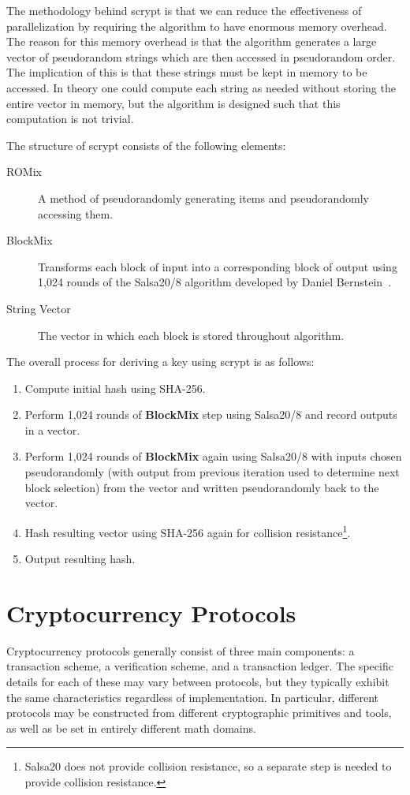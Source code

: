 \documentclass[11pt]{article}
\begin{document}
The methodology behind scrypt is that we can
reduce the effectiveness of parallelization by requiring the algorithm to have
enormous memory overhead. The reason for this memory overhead is that the
algorithm generates a large vector of pseudorandom strings which are then
accessed in pseudorandom order. The implication of this is that these strings
must be kept in memory to be accessed. In theory one could compute each string
as needed without storing the entire vector in memory, but the algorithm is
designed such that this computation is not trivial.

The structure of scrypt consists of the following elements:
\begin{description}
\item[ROMix] A method of pseudorandomly generating items and pseudorandomly
    accessing them.
\item[BlockMix] Transforms each block of input into a corresponding block of
    output using 1,024 rounds of the {\sc Salsa20/8} algorithm developed by Daniel
    Bernstein~\cite{bernstein08}.
\item[String Vector] The vector in which each block is stored throughout
    algorithm.
\end{description}

The overall process for deriving a key using scrypt is as follows:
\begin{enumerate}
    \item Compute initial hash using {\sc SHA-256}.
    \item Perform 1,024 rounds of \textbf{BlockMix} step using {\sc Salsa20/8}
        and record outputs in a vector.
    \item Perform 1,024 rounds of \textbf{BlockMix} again using {\sc Salsa20/8}
        with inputs chosen pseudorandomly (with output from previous iteration
        used to determine next block selection) from the vector and written
        pseudorandomly back to the vector.
    \item Hash resulting vector using {\sc SHA-256} again for collision
        resistance\footnote{{\sc Salsa20} does not provide collision resistance,
        so a separate step is needed to provide collision resistance.}.
    \item Output resulting hash.
\end{enumerate}

\section{Cryptocurrency Protocols}
Cryptocurrency protocols generally consist of three main components: a
transaction scheme, a verification scheme, and a transaction ledger. The specific
details for each of these may vary between protocols, but they typically exhibit
the same characteristics regardless of implementation. In particular, different
protocols may be constructed from different cryptographic primitives and tools,
as well as be set in entirely different math domains.
\end{document}
